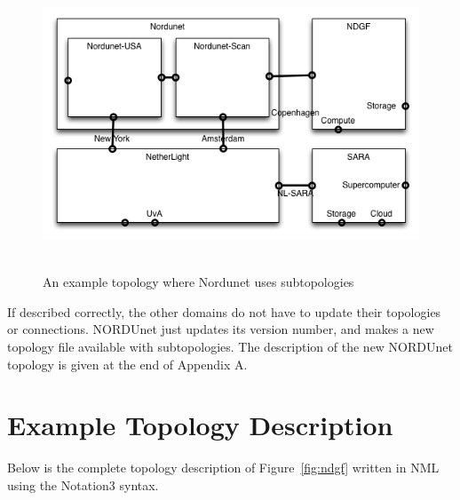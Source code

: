 \documentclass[12pt]{article}  %
\begin{document}
\begin{figure}[htbp]
\begin{center}
\includegraphics[width=403pt, height=248pt]{NSITopologyService-fig002.png}
\caption{An example topology where Nordunet uses subtopologies}\label{fig:ndgf2}
\end{center}
\end{figure}


 If described correctly, the other domains do not have to update 
their topologies or connections. NORDUnet just updates its version number, and 
makes a new topology file available with subtopologies. The description of the 
new NORDUnet topology is given at the end of Appendix A.\label{h.ikfi9yd4mu6x}

\pagebreak
\appendix
\section{Example Topology Description}\label{app:A}

 Below is the complete topology description of Figure~\ref{fig:ndgf} written 
in NML using the Notation3 syntax.
\end{document}

